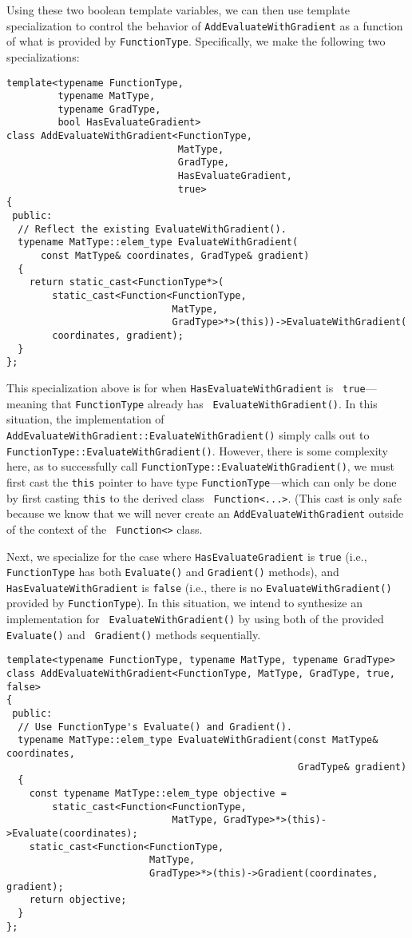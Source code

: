Using these two boolean template variables, we can then use template
specialization to control the behavior of {\tt AddEvaluateWithGradient} as a
function of what is provided by {\tt FunctionType}.  Specifically, we make the
following two specializations:

\begin{verbatim}
template<typename FunctionType,
         typename MatType,
         typename GradType,
         bool HasEvaluateGradient>
class AddEvaluateWithGradient<FunctionType,
                              MatType,
                              GradType,
                              HasEvaluateGradient,
                              true>
{
 public:
  // Reflect the existing EvaluateWithGradient().
  typename MatType::elem_type EvaluateWithGradient(
      const MatType& coordinates, GradType& gradient)
  {
    return static_cast<FunctionType*>(
        static_cast<Function<FunctionType,
                             MatType,
                             GradType>*>(this))->EvaluateWithGradient(
        coordinates, gradient);
  }
};
\end{verbatim}

This specialization above is for when {\tt HasEvaluateWithGradient} is {\tt
true}---meaning that {\tt FunctionType} already has {\tt
EvaluateWithGradient()}.  In this situation, the implementation of {\tt
AddEvaluateWithGradient::EvaluateWithGradient()} simply calls out to {\tt
FunctionType::EvaluateWithGradient()}.  However, there is some complexity here,
as to successfully call {\tt FunctionType::EvaluateWithGradient()}, we must
first cast the {\tt this} pointer to have type {\tt FunctionType}---which can
only be done by first casting {\tt this} to the derived class {\tt
Function<...>}.  (This cast is only safe because we know that we will never
create an {\tt AddEvaluateWithGradient} outside of the context of the {\tt
Function<>} class.

Next, we specialize for the case where {\tt HasEvaluateGradient} is {\tt true}
(i.e., {\tt FunctionType} has both {\tt Evaluate()} and {\tt Gradient()}
methods), and {\tt HasEvaluateWithGradient} is {\tt false} (i.e., there is no
{\tt EvaluateWithGradient()} provided by {\tt FunctionType}).  In this
situation, we intend to synthesize an implementation for {\tt
EvaluateWithGradient()} by using both of the provided {\tt Evaluate()} and {\tt
Gradient()} methods sequentially.

\begin{verbatim}
template<typename FunctionType, typename MatType, typename GradType>
class AddEvaluateWithGradient<FunctionType, MatType, GradType, true, false>
{
 public:
  // Use FunctionType's Evaluate() and Gradient().
  typename MatType::elem_type EvaluateWithGradient(const MatType& coordinates,
                                                   GradType& gradient)
  {
    const typename MatType::elem_type objective =
        static_cast<Function<FunctionType,
                             MatType, GradType>*>(this)->Evaluate(coordinates);
    static_cast<Function<FunctionType,
                         MatType,
                         GradType>*>(this)->Gradient(coordinates, gradient);
    return objective;
  }
};
\end{verbatim}

